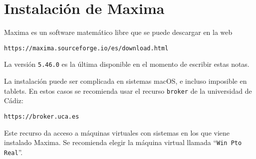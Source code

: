 
\section*{Instalación de Maxima}
Maxima es un software matemático libre
que se puede descargar en la web
\begin{center}
\verb|https://maxima.sourceforge.io/es/download.html|
\end{center}
La versión \texttt{5.46.0} es la última disponible
en el momento de escribir estas notas.

La instalación puede ser complicada en sistemas macOS, e
incluso imposible en tablets.
En estos casos se recomienda usar el recurso \texttt{broker}
de la universidad de Cádiz:
\begin{center}
\verb|https://broker.uca.es|
\end{center}
Este recurso da acceso a máquinas virtuales con sistemas
en los que viene instalado Maxima.
Se recomienda elegir la máquina virtual llamada
``\texttt{Win Pto Real}''.
